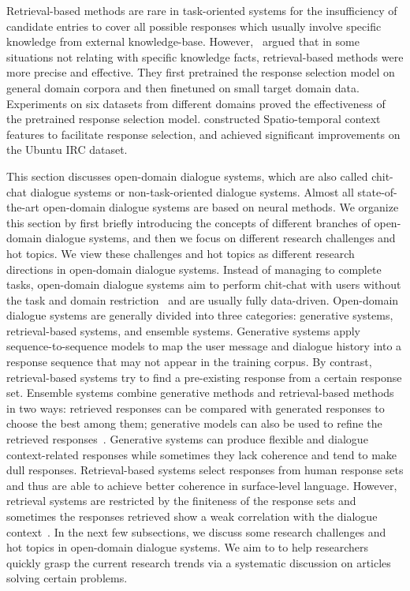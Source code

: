 Retrieval-based methods are rare in task-oriented systems for the insufficiency of candidate entries to cover all possible responses which usually involve specific knowledge from external knowledge-base. However,~ argued that in some situations not relating with specific knowledge facts, retrieval-based methods were more precise and effective. They first pretrained the response selection model on general domain corpora and then finetuned on small target domain data. Experiments on six datasets from different domains proved the effectiveness of the pretrained response selection model.  constructed Spatio-temporal context features to facilitate response selection, and achieved significant improvements on the Ubuntu IRC dataset.

\label{Open-Domain Dialogue Systems}
This section discusses open-domain dialogue systems, which are also called chit-chat dialogue systems or non-task-oriented dialogue systems. Almost all state-of-the-art open-domain dialogue systems are based on neural methods. We organize this section by first briefly introducing the concepts of different branches of open-domain dialogue systems, and then we focus on different research challenges and hot topics. We view these challenges and hot topics as different research directions in open-domain dialogue systems. 
Instead of managing to complete tasks, open-domain dialogue systems aim to perform chit-chat with users without the task and domain restriction~ and are usually fully data-driven. Open-domain dialogue systems are generally divided into three categories: generative systems, retrieval-based systems, and ensemble systems. Generative systems apply sequence-to-sequence models to map the user message and dialogue history into a response sequence that may not appear in the training corpus. By contrast, retrieval-based systems try to find a pre-existing response from a certain response set. Ensemble systems combine generative methods and retrieval-based methods in two ways: retrieved responses can be compared with generated responses to choose the best among them; generative models can also be used to refine the retrieved responses~. Generative systems can produce flexible and dialogue context-related responses while sometimes they lack coherence and tend to make dull responses. Retrieval-based systems select responses from human response sets and thus are able to achieve better coherence in surface-level language. However, retrieval systems are restricted by the finiteness of the response sets and sometimes the responses retrieved show a weak correlation with the dialogue context~. 
In the next few subsections, we discuss some research challenges and hot topics in open-domain dialogue systems. We aim to to help researchers quickly grasp the current research trends via a systematic discussion on articles solving certain problems.

